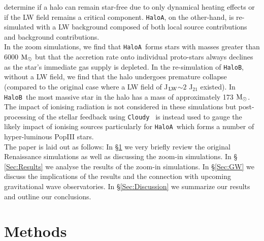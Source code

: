 \documentclass[graphics, twocolumn, usenatbib]{mn2e}
\newcommand{\cloudy}{\texttt{Cloudy~}}
\newcommand{\msolar} {$\rm{M_{\odot}}~$}
\newcommand{\msolarc} {$\rm{M_{\odot}}$}
\newcommand{\JLW} {J$_{\rm LW}$}
\newcommand{\ha} {\texttt{HaloA~}}
\newcommand{\hb} {\texttt{HaloB~}}
\newcommand{\hac} {\texttt{HaloA}}
\newcommand{\hbc} {\texttt{HaloB}}
\begin{document}
  determine if a halo can remain star-free due to only dynamical heating effects or if the LW field 
  remains a critical component. \hac, on the other-hand, is re-simulated with a LW background
  composed of both local source contributions and background contributions. \\
  \indent In the zoom simulations, we find that \ha forms stars with masses greater than
  6000 \msolar but that the accretion rate onto individual proto-stars always declines as the star's
  immediate gas supply is depleted. In the re-simulation of \hbc, without a LW field, we find that
  the halo undergoes premature collapse (compared to the original case where a LW field of
  \JLW $\sim 2$ J$_{21}$ existed). In \hb the most massive star in the halo has a mass of
  approximately 173 \msolarc. The impact of ionising radiation is not considered in these
  simulations but post-processing of the stellar feedback using \cloudy \citep{Ferland_2017} is
  instead used to gauge the likely impact of ionising sources particularly for \ha which forms a
  number of hyper-luminous PopIII stars. \\
  \indent The paper is laid out as follows: In \S \ref{Sec:Methods} we very briefly review the
  original Renaissance simulations as well as discussing the zoom-in simulations. In \S
  \ref{Sec:Results} we analyse the results of the zoom-in simulations. In \S \ref{Sec:GW} we
  discuss the implications of the results and the connection with upcoming gravitational wave
  observatories. In \S \ref{Sec:Discussion} we summarize our results and outline
  our conclusions.

\section{Methods} \label{Sec:Methods}
\end{document}
